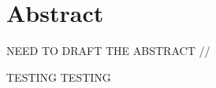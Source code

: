 \chapter*{Abstract \label{sec:abstract}}

NEED TO DRAFT THE ABSTRACT \cite{IOTpassiveRadar}
// 

TESTING TESTING